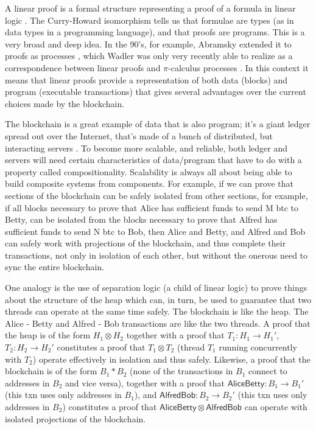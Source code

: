 \documentclass[]{acm_proc_article-sp}
\numberwithin{equation}{subsection}
\begin{document}
A linear proof is a formal structure representing a proof of a formula
in linear logic \cite{DBLP:journals/tcs/Girard87}.  The Curry-Howard
isomorphism \cite{Sorensen98lectureson} tells us that formulae are
types (as in data types in a programming language), and that proofs
are programs. This is a very broad and deep idea. In the 90's, for
example, Abramsky extended it to proofs as processes
\cite{DBLP:journals/tcs/Abramsky94}, which Wadler was only very
recently able to realize as a correspondence between linear proofs and
{$\pi$}-calculus processes \cite{DBLP:journals/jfp/Wadler14}. In this
context it means that linear proofs provide a representation of both
data (blocks) and program (executable transactions) that gives several
advantages over the current choices made by the blockchain.

The blockchain is a great example of data that is also program; it's a
giant ledger spread out over the Internet, that's made of a bunch of
distributed, but interacting servers \cite{Nakamoto2008}. To become
more scalable, and reliable, both ledger and servers will need certain
characteristics of data/program that have to do with a property called
compositionality. Scalability is always all about being able to build
composite systems from components. For example, if we can prove that
sections of the blockchain can be safely isolated from other sections,
for example, if all blocks necessary to prove that Alice has
sufficient funds to send M btc to Betty, can be isolated from the
blocks necessary to prove that Alfred has sufficient funds to send N
btc to Bob, then Alice and Betty, and Alfred and Bob can safely work
with projections of the blockchain, and thus complete their
transactions, not only in isolation of each other, but without the
onerous need to sync the entire blockchain.

One analogy is the use of separation logic (a child of linear logic)
\cite{DBLP:conf/vstte/Reynolds05} to prove things about the structure
of the heap which can, in turn, be used to guarantee that two threads
can operate at the same time safely. The blockchain is like the
heap. The Alice - Betty and Alfred - Bob transactions are like the two
threads. A proof that the heap is of the form $H_1 \otimes H_2$
together with a proof that $T_1 : H_1 \rightarrow H_1'$, $T_2 : H_2
\rightarrow H_2'$ constitutes a proof that $T_1 \otimes T_2$ (thread
$T_1$ running concurrently with $T_2$) operate effectively in
isolation and thus safely. Likewise, a proof that the blockchain is of
the form $B_1 * B_2$ (none of the transactions in $B_1$ connect to
addresses in $B_2$ and vice versa), together with a proof that
$\mathsf{AliceBetty} : B_1 \rightarrow B_1'$ (this txn uses only addresses
in $B_1$), and $\mathsf{AlfredBob} : B_2 \rightarrow B_2'$ (this txn uses
only addresses in $B_2$) constitutes a proof that $\mathsf{AliceBetty}
\otimes \mathsf{AlfredBob}$ can operate with isolated projections of the
blockchain.
\end{document}
